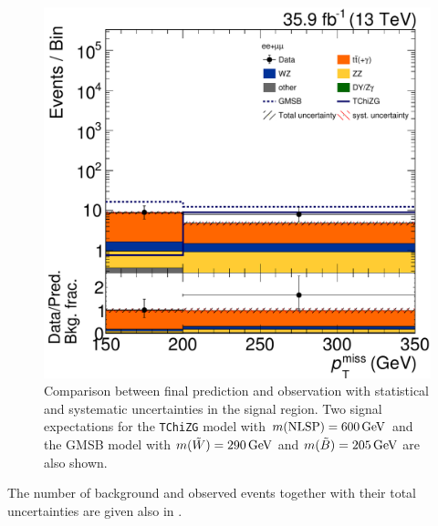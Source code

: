 \begin{figure}[bpt]
 \centering
 \includegraphics[width=\pairwidth]{figures/EndorsementPlots/final_MC_log2}
 \caption{Comparison between final prediction and observation with statistical and systematic uncertainties in the signal region. Two signal expectations for the \texttt{TChiZG} model with $m(\text{NLSP})=600\,\text{Ge\hspace{-.08em}V}$ and the GMSB model with $m(\tilde{W})=290\,\text{Ge\hspace{-.08em}V}$ and $m(\tilde{B})=205\,\text{Ge\hspace{-.08em}V}$ are also shown.}
 \label{fig:result}
\end{figure}
The number of background and observed events together with their total uncertainties are given also in .
